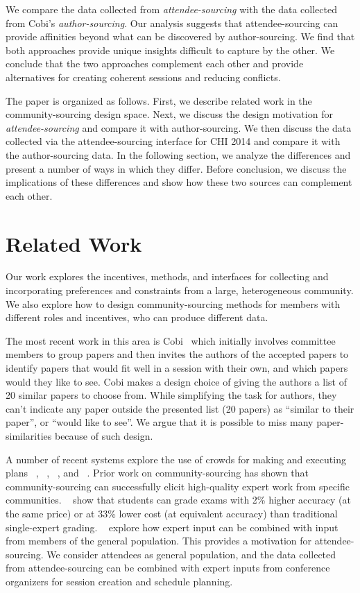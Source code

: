 \documentclass[letterpaper]{article}
\begin{document}
We compare the data collected from \emph{attendee-sourcing} with the data collected from Cobi's \emph{author-sourcing}. Our analysis suggests that attendee-sourcing can provide affinities beyond what can be discovered by author-sourcing. We find that both approaches provide unique insights difficult to capture by the other. We conclude that the two approaches complement each other and provide alternatives for creating coherent sessions and reducing conflicts.

The paper is organized as follows. First, we describe related work in the community-sourcing design space. Next, we discuss the design motivation for \emph{attendee-sourcing} and compare it with author-sourcing. We then discuss the data collected via the attendee-sourcing interface for CHI 2014 and compare it with the author-sourcing data. In the following section, we analyze the differences and present a number of ways in which they differ. Before conclusion, we discuss the implications of these differences and show how these two sources can complement each other.

\section{Related Work}
Our work explores the incentives, methods, and interfaces for collecting and incorporating preferences and constraints from a large, heterogeneous community. We also explore how to design community-sourcing methods for members with different roles and incentives, who can produce different data.

The most recent work in this area is Cobi~\cite{CobiUIST2013} which initially involves committee members to group papers and then invites the authors of the accepted papers to identify papers that would fit well in a session with their own, and which papers would they like to see. Cobi makes a design choice of giving the authors a list of 20 similar papers to choose from. While simplifying the task for authors, they can't indicate any paper outside the presented list (20 papers) as ``similar to their paper'', or ``would like to see''. We argue that it is possible to miss many paper-similarities because of such design.

A number of recent systems explore the use of crowds for making and executing plans ~\cite{CollaborativePlanning}, ~\cite{Turkomatic}, ~\cite{HCT}, and ~\cite{EmailVallet}. Prior work on community-sourcing has shown that community-sourcing can successfully elicit high-quality expert work from specific communities. ~\cite{CommunitySourcing} show that students can grade exams with 2\% higher accuracy (at the same price) or at 33\% lower cost (at equivalent accuracy) than traditional single-expert grading. ~\cite{CrowdDiversity} explore how expert input can be combined with input from members of the general population. This provides a motivation for attendee-sourcing. We consider attendees as general population, and the data collected from attendee-sourcing can be combined with expert inputs from conference organizers for session creation and schedule planning.
\end{document}
